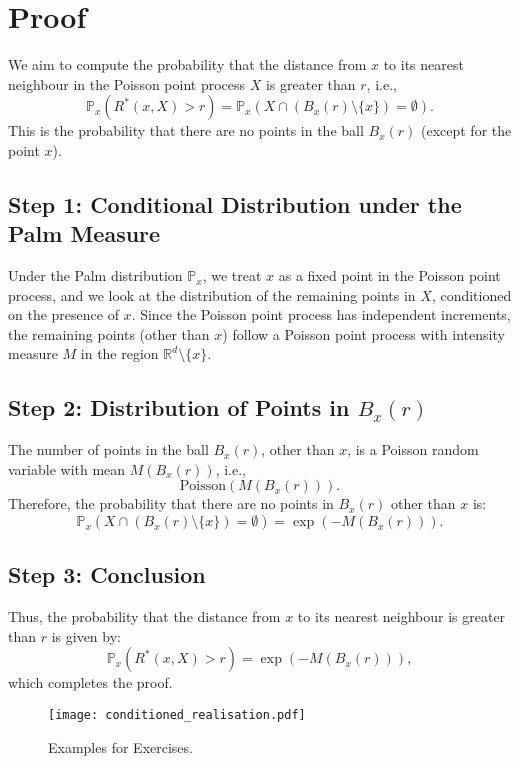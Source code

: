 \documentclass{article}
\begin{document}
\section*{Proof}
We aim to compute the probability that the distance from \( x \) to its nearest neighbour in the Poisson point process \( X \) is greater than \( r \), i.e., 
\[
\mathbb{P}_x(R^*(x, X) > r) = \mathbb{P}_x\left(X \cap (B_x(r) \setminus \{x\}) = \emptyset\right).
\]
This is the probability that there are no points in the ball \( B_x(r) \) (except for the point \( x \)).

\subsection*{Step 1: Conditional Distribution under the Palm Measure}
Under the Palm distribution \( \mathbb{P}_x \), we treat \( x \) as a fixed point in the Poisson point process, and we look at the distribution of the remaining points in \( X \), conditioned on the presence of \( x \).
Since the Poisson point process has independent increments, the remaining points (other than \( x \)) follow a Poisson point process with intensity measure \( M \) in the region \( \mathbb{R}^d \setminus \{x\} \).

\subsection*{Step 2: Distribution of Points in \( B_x(r) \)}
The number of points in the ball \( B_x(r) \), other than \( x \), is a Poisson random variable with mean \( M(B_x(r)) \), i.e.,
\[
\text{Poisson}(M(B_x(r))).
\]
Therefore, the probability that there are no points in \( B_x(r) \) other than \( x \) is:
\[
\mathbb{P}_x\left( X \cap (B_x(r) \setminus \{x\}) = \emptyset \right) = \exp\left(-M(B_x(r))\right).
\]

\subsection*{Step 3: Conclusion}
Thus, the probability that the distance from \( x \) to its nearest neighbour is greater than \( r \) is given by:
\[
\mathbb{P}_x(R^*(x, X) > r) = \exp\left(-M(B_x(r))\right),
\]
which completes the proof.

\begin{figure}[h!]
    \centering
    \texttt{[image: conditioned\_realisation.pdf]}
    \caption{Examples for Exercises.}
\end{figure}
\end{document}
